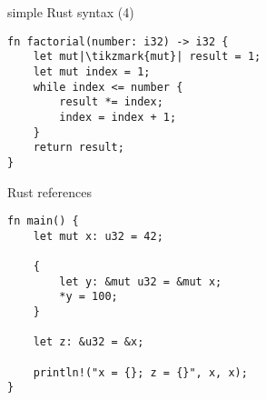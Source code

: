 \begin{frame}[fragile,label=rustHelloWorld4]{simple Rust syntax (4)}
    \begin{verbatim}
fn factorial(number: i32) -> i32 {
    let mut|\tikzmark{mut}| result = 1;
    let mut index = 1;
    while index <= number {
        result *= index;
        index = index + 1;
    }
    return result;
}
\end{verbatim}
\end{frame}

\begin{frame}[fragile,label=rustTimesTwoB]{Rust references}
\vspace{-.25cm}
    \begin{verbatim}
fn main() {
    let mut x: u32 = 42;

    {
        let y: &mut u32 = &mut x;
        *y = 100;
    }

    let z: &u32 = &x;

    println!("x = {}; z = {}", x, x);
}
\end{verbatim}
\end{frame}

